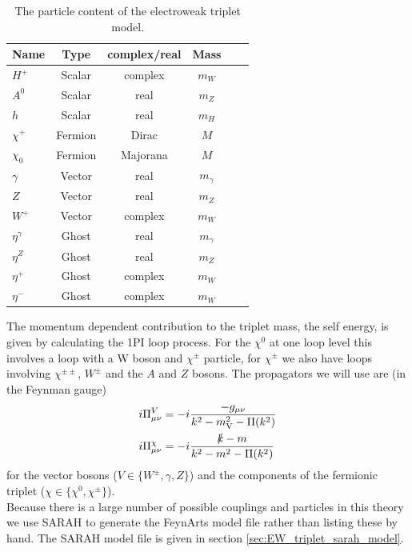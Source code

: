 \documentclass[11pt]{article}
\newcommand{\sarah}{\textsf{SARAH} }
\newcommand{\feynarts}{\textsf{FeynArts} }
\begin{document}
\begin{table}[h]
 \caption{The particle content of the electroweak triplet model.}\label{tab:particles}
 \vspace{0.3cm}
 \centering 
\begin{tabular}{lccccc}
\hline 
Name & Type & complex/real & Mass  \\ 
\hline \hline 
\(H^+\) & Scalar &complex& $m_W$\\
 \(A^0\) & Scalar &real & $m_Z$\\
 \(h\) & Scalar &real & $m_H$\\
 \hline 
\(\chi^{+}\) & Fermion &Dirac & $M$\\
 \(\chi_0\) & Fermion &Majorana & $M$\\
 \hline 
\(\gamma\) & Vector &real & $m_{\gamma}$\\
 \(Z\) & Vector &real & $m_Z$\\
 \(W^+\) & Vector &complex & $m_W$\\
 \(\eta^{\gamma}\) & Ghost &real & $m_{\gamma}$\\
 \(\eta^Z\) & Ghost &real & $m_Z$\\
 \(\eta^+\) & Ghost &complex & $m_W$\\
 \(\eta^-\) & Ghost &complex & $m_W$\\
 \hline
\end{tabular}
 \end{table}
The momentum dependent contribution to the triplet mass, the self energy, is given by calculating the 1PI loop process.  For the $
\chi^0$ at one loop level this involves a loop with a W boson and $\chi^{\pm}$ particle, for $\chi^{\pm}$ we also have loops involving $
\chi^{\pm\pm}$, $W^{\pm}$ and the $A$ and $Z$ bosons.  The propagators we will use are (in the Feynman gauge)
\begin{align}
i\Pi^{V}_{\mu\nu}&=-i\frac{-g_{\mu\nu}}{k^2-m_{\text{V}}^2- \Pi(k^2)}\label{eqn:gauge_boson_propagator}\\ 
i\Pi^{\chi}_{\mu\nu}&=-i\frac{\slashed{k}-m}{k^2-m^2- \Pi(k^2)}
\end{align}
for the vector bosons ($V\in\{W^{\pm},\gamma,Z\}$) and the components of the fermionic triplet ($\chi\in\{\chi^0,\chi^{\pm}\}$).\\

Because there is a large number of possible couplings and particles in this theory we use \sarah \cite{Staub2014} to generate the \feynarts \cite{Hahn2000} model file rather than listing these by hand.  The \sarah model file is given in section \ref{sec:EW_triplet_sarah_model}.\\
\end{document}
